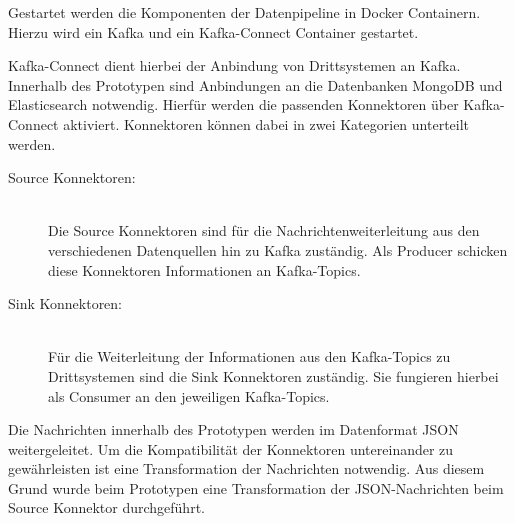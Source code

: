 Gestartet werden die Komponenten der Datenpipeline in Docker Containern. Hierzu wird ein Kafka und ein Kafka-Connect Container gestartet.

Kafka-Connect dient hierbei der Anbindung von Drittsystemen an Kafka. Innerhalb des Prototypen sind Anbindungen an die Datenbanken MongoDB und Elasticsearch notwendig. Hierfür werden die passenden Konnektoren über Kafka-Connect aktiviert. Konnektoren können dabei in zwei Kategorien unterteilt werden.

\begin{description}
    \item[Source Konnektoren:]\hfill \\
    Die Source Konnektoren sind für die Nachrichtenweiterleitung aus den verschiedenen Datenquellen hin zu Kafka zuständig. Als Producer schicken diese Konnektoren Informationen an Kafka-Topics.
    
    \item[Sink Konnektoren:]\hfill \\ 
    Für die Weiterleitung der Informationen aus den Kafka-Topics zu Drittsystemen sind die Sink Konnektoren zuständig. Sie fungieren hierbei als Consumer an den jeweiligen Kafka-Topics.

\end{description}

Die Nachrichten innerhalb des Prototypen werden im Datenformat JSON weitergeleitet. Um die Kompatibilität der Konnektoren untereinander zu gewährleisten ist eine Transformation der Nachrichten notwendig. Aus diesem Grund wurde beim Prototypen eine Transformation der JSON-Nachrichten beim Source Konnektor durchgeführt.


